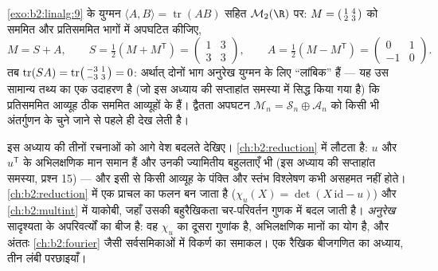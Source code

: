 \begin{example}[अनुरेख युग्मन आव्यूह समष्टि को बाँटता है]\label{ex:b2:linalg:tracepairing}
\cref{exo:b2:linalg:9} के युग्मन $\langle A, B\rangle =
\operatorname{tr}(AB)$ सहित $\mathcal{M}_2(\R)$ पर: $M =
\begin{psmallmatrix}1 & 4\\ 2 & 3\end{psmallmatrix}$ को सममित और प्रतिसममित भागों में
अपघटित कीजिए,
\[
M = S + A, \qquad
S = \tfrac12(M + M^{\mathsf T}) =
\begin{pmatrix}1 & 3\\ 3 & 3\end{pmatrix},
\qquad
A = \tfrac12(M - M^{\mathsf T}) =
\begin{pmatrix}0 & 1\\ -1 & 0\end{pmatrix}.
\]
तब $\operatorname{tr}(SA) = \operatorname{tr}
\begin{psmallmatrix}-3 & 1\\ -3 & 3\end{psmallmatrix} = 0$: अर्थात् दोनों भाग अनुरेख युग्मन के लिए ``लांबिक'' हैं --- यह
उस सामान्य तथ्य का एक उदाहरण है (जो इस अध्याय की सप्ताहांत समस्या में
सिद्ध किया गया है) कि प्रतिसममित आव्यूह ठीक सममित आव्यूहों के 
हैं। द्वैतता अपघटन $\mathcal{M}_n = \mathcal{S}_n \oplus
\mathcal{A}_n$ को किसी भी अंतर्गुणन के चुने जाने से पहले ही
देख लेती है।
\end{example}

\begin{remark}[इसी खंड के भीतर के परिप्रेक्ष्य]\label{rem:b2:linalg:perspectives}
इस अध्याय की तीनों रचनाओं को आगे वेश बदलते देखिए। \emph{} \cref{ch:b2:reduction}
में लौटता है: $u$ और $u^{\mathsf T}$ के अभिलक्षणिक मान समान हैं और उनकी ज्यामितीय
बहुलताएँ भी (इस अध्याय की सप्ताहांत समस्या, प्रश्न 15) --- और इसी से
किसी आव्यूह के पंक्ति और स्तंभ विश्लेषण कभी असहमत नहीं होते।
\emph{} \cref{ch:b2:reduction} में एक प्राचल का फलन बन जाता है ($\chi_u(X) = \det(X\,\mathrm{id} - u)$) और \cref{ch:b2:multint} में
याकोबी, जहाँ उसकी बहुरैखिकता चर-परिवर्तन गुणक में बदल जाती है।
\emph{अनुरेख} सादृश्यता के अपरिवर्त्यों का बीज है: वह $\chi_u$ का दूसरा
गुणांक है, अभिलक्षणिक मानों का योग है, और अंततः \cref{ch:b2:fourier} जैसी सर्वसमिकाओं
में विकर्ण का समाकल। एक रैखिक बीजगणित का अध्याय, तीन लंबी परछाइयाँ।
\end{remark}

